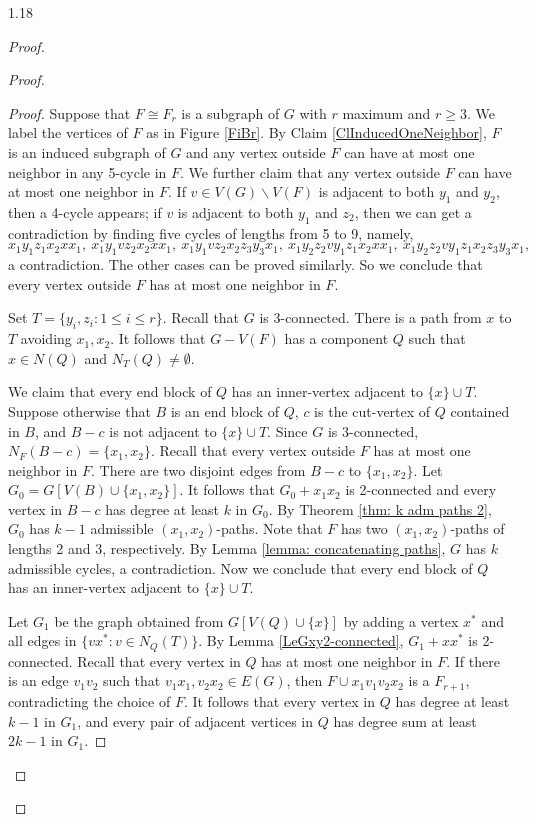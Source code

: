 \documentclass[10pt]{article}
\begin{document}
\begin{spacing}{1.18}
\begin{proof}
\begin{proof}
    \begin{proof}
        Suppose that $F\cong F_r$ is a subgraph of $G$ with $r$ maximum and $r\geqslant 3$. We label the vertices of $F$ as in Figure \ref{FiBr}. By Claim \ref{ClInducedOneNeighbor}, $F$ is an induced subgraph of $G$ and any vertex outside $F$ can have at most one neighbor in any 5-cycle in $F$. We further claim that any vertex outside $F$ can have at most one neighbor in $F$. If $v\in V(G)\backslash V(F)$ is adjacent to both $y_1$ and $y_2$, then a 4-cycle appears; if $v$ is adjacent to both $y_1$ and $z_2$, then we can get a contradiction by finding five cycles of lengths from 5 to 9, namely,
        \[
        x_1y_1z_1x_2xx_1,~
        x_1y_1vz_2x_2xx_1,~ 
        x_1y_1vz_2x_2z_3y_3x_1,~
        x_1y_2z_2vy_1z_1x_2xx_1,~
        x_1y_2z_2vy_1z_1x_2z_3y_3x_1,
        \]
        a contradiction. The other cases can be proved similarly. So we conclude that every vertex outside $F$ has at most one neighbor in $F$.

        Set $T=\{y_i,z_i: 1\leqslant i\leqslant r\}$. Recall that $G$ is 3-connected. There is a path from $x$ to $T$ avoiding $x_1,x_2$. It follows that $G-V(F)$ has a component $Q$ such that $x\in N(Q)$ and $N_T(Q)\neq\emptyset$. 

        We claim that every end block of $Q$ has an inner-vertex adjacent to $\{x\}\cup T$. Suppose otherwise that $B$ is an end block of $Q$, $c$ is the cut-vertex of $Q$ contained in $B$, and $B-c$ is not adjacent to $\{x\}\cup T$. Since $G$ is $3$-connected, $N_F(B-c)=\{x_1,x_2\}$. Recall that every vertex outside $F$ has at most one neighbor in $F$. There are two disjoint edges from $B-c$ to $\{x_1,x_2\}$. Let $G_0=G[V(B)\cup\{x_1,x_2\}]$. It follows that $G_0+x_1x_2$ is 2-connected and every vertex in $B-c$ has degree at least $k$ in $G_0$. By Theorem \ref{thm: k adm paths 2}, $G_0$ has $k-1$ admissible $(x_1,x_2)$-paths. Note that $F$ has two $(x_1,x_2)$-paths of lengths 2 and 3, respectively. By Lemma \ref{lemma: concatenating paths}, $G$ has $k$ admissible cycles, a contradiction. Now we conclude that every end block of $Q$ has an inner-vertex adjacent to $\{x\}\cup T$.    
        
        Let $G_1$ be the graph obtained from $G[V(Q)\cup\{x\}]$ by adding a vertex $x^*$ and all edges in $\{vx^*: v\in N_Q(T)\}$. By Lemma \ref{LeGxy2-connected}, $G_1+xx^*$ is 2-connected. Recall that every vertex in $Q$ has at most one neighbor in $F$. If there is an edge $v_1v_2$ such that $v_1x_1,v_2x_2\in E(G)$, then $F\cup x_1v_1v_2x_2$ is a $F_{r+1}$, contradicting the choice of $F$. It follows that every vertex in $Q$ has degree at least $k-1$ in $G_1$, and every pair of adjacent vertices in $Q$ has degree sum at least $2k-1$ in $G_1$. 
        

\end{proof}
\end{proof}
\end{proof}
\end{spacing}
\end{document}
